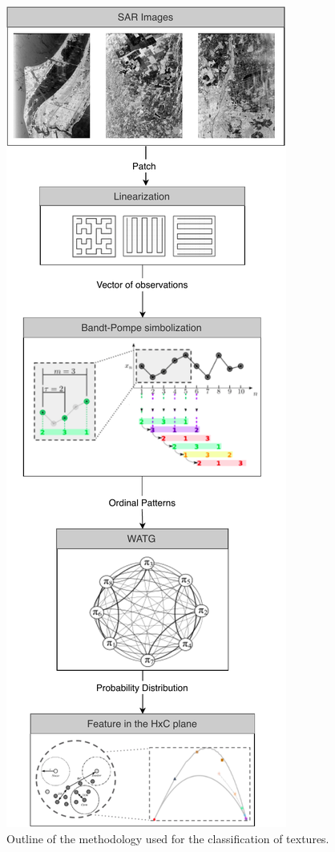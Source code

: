 \documentclass[journal]{IEEEtran}
\begin{document}
	\begin{figure}[hbt]
		\centering
		\includegraphics[width=.7\columnwidth]{Figures/methodology.pdf}
		\caption{Outline of the methodology used for the classification of textures.}
		\label{fig:WATG}
	\end{figure}
	
\end{document}
